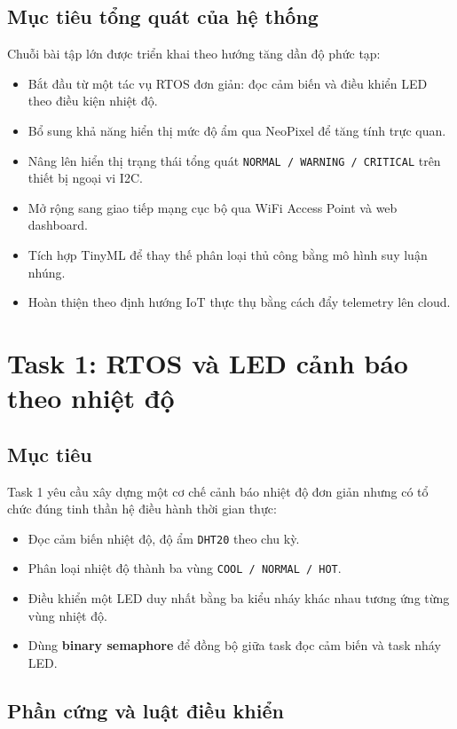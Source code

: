 \documentclass[12pt,a4paper]{article}
\begin{document}
\subsection{Mục tiêu tổng quát của hệ thống}

Chuỗi bài tập lớn được triển khai theo hướng tăng dần độ phức tạp:
\begin{itemize}
  \item Bắt đầu từ một tác vụ RTOS đơn giản: đọc cảm biến và điều khiển LED theo điều kiện nhiệt độ.
  \item Bổ sung khả năng hiển thị mức độ ẩm qua NeoPixel để tăng tính trực quan.
  \item Nâng lên hiển thị trạng thái tổng quát \texttt{NORMAL / WARNING / CRITICAL} trên thiết bị ngoại vi I2C.
  \item Mở rộng sang giao tiếp mạng cục bộ qua WiFi Access Point và web dashboard.
  \item Tích hợp TinyML để thay thế phân loại thủ công bằng mô hình suy luận nhúng.
  \item Hoàn thiện theo định hướng IoT thực thụ bằng cách đẩy telemetry lên cloud.
\end{itemize}

\section{Task 1: RTOS và LED cảnh báo theo nhiệt độ}

\subsection{Mục tiêu}

Task 1 yêu cầu xây dựng một cơ chế cảnh báo nhiệt độ đơn giản nhưng có tổ chức đúng tinh thần hệ điều hành thời gian thực:
\begin{itemize}
  \item Đọc cảm biến nhiệt độ, độ ẩm \texttt{DHT20} theo chu kỳ.
  \item Phân loại nhiệt độ thành ba vùng \texttt{COOL / NORMAL / HOT}.
  \item Điều khiển một LED duy nhất bằng ba kiểu nháy khác nhau tương ứng từng vùng nhiệt độ.
  \item Dùng \textbf{binary semaphore} để đồng bộ giữa task đọc cảm biến và task nháy LED.
\end{itemize}

\subsection{Phần cứng và luật điều khiển}
\end{document}
